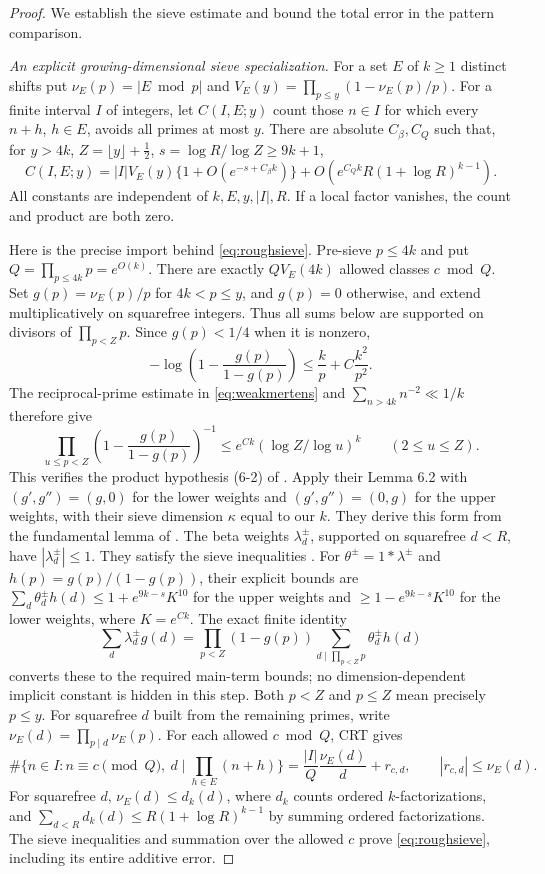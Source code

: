 \documentclass[11pt,a4paper]{article}
\begin{document}
\begin{proof}
We establish the sieve estimate and bound the total error in the pattern comparison.

\smallskip\noindent\emph{An explicit growing-dimensional sieve specialization.}
For a set $E$ of $k\ge1$ distinct shifts put
$\nu_E(p)=|E\bmod p|$ and
$V_E(y)=\prod_{p\le y}(1-\nu_E(p)/p)$.
For a finite interval $I$ of integers, let $C(I,E;y)$
count those $n\in I$ for which every $n+h$, $h\in E$, avoids all
primes at most $y$. There are absolute $C_\beta,C_Q$ such that,
for $y>4k$, $Z=\lfloor y\rfloor+\tfrac12$, $s=\log R/\log Z\ge9k+1$,
\begin{equation}\label{eq:roughsieve}
 C(I,E;y)=|I|V_E(y)\{1+O(e^{-s+C_\beta k})\}
       +O\!\left(e^{C_Qk}R(1+\log R)^{k-1}\right).
\end{equation}
All constants are independent of $k,E,y,|I|,R$.
If a local factor vanishes, the count and product are both zero.

Here is the precise import behind \eqref{eq:roughsieve}.
Pre-sieve $p\le4k$ and put $Q=\prod_{p\le4k}p=e^{O(k)}$.
There are exactly $QV_E(4k)$ allowed classes $c\bmod Q$.
Set $g(p)=\nu_E(p)/p$ for $4k<p\le y$, and $g(p)=0$ otherwise,
and extend multiplicatively on squarefree integers. Thus all sums below
are supported on divisors of $\prod_{p<Z}p$.
Since $g(p)<1/4$ when it is nonzero,
\[
 -\log\left(1-\frac{g(p)}{1-g(p)}\right)
       \le \frac{k}{p}+C\frac{k^2}{p^2}.
\]
The reciprocal-prime estimate in \eqref{eq:weakmertens}
and $\sum_{n>4k}n^{-2}\ll1/k$ therefore give
\[
 \prod_{u\le p<Z}\left(1-\frac{g(p)}{1-g(p)}\right)^{-1}
       \le e^{Ck}(\log Z/\log u)^k\qquad(2\le u\le Z).
\]
This verifies the product hypothesis (6-2) of
\cite[Section 6]{thornerzaman2019}. Apply their Lemma 6.2 with
$(g',g'')=(g,0)$ for the lower weights and $(g',g'')=(0,g)$ for the
upper weights, with their sieve dimension $\kappa$ equal to our $k$.
They derive this form from the fundamental lemma of
\cite[Lemma 6.8]{friedlanderiwaniec}. The beta weights $\lambda_d^\pm$,
supported on squarefree $d<R$, have $|\lambda_d^\pm|\le1$.
They satisfy the sieve inequalities \cite[equation (6-4)]{thornerzaman2019}.
For $\theta^\pm=1*\lambda^\pm$ and $h(p)=g(p)/(1-g(p))$, their
explicit bounds are $\sum_d\theta_d^\pm h(d)\le1+e^{9k-s}K^{10}$
for the upper weights and $\ge1-e^{9k-s}K^{10}$ for the lower weights,
where $K=e^{Ck}$. The exact finite identity
\[
 \sum_d\lambda_d^\pm g(d)
       =\prod_{p<Z}(1-g(p))\sum_{d\mid\prod_{p<Z}p}\theta_d^\pm h(d)
\]
converts these to the required main-term bounds; no dimension-dependent
implicit constant is hidden in this step. Both $p<Z$ and $p\le Z$
mean precisely $p\le y$.
For squarefree $d$ built from the remaining primes, write
$\nu_E(d)=\prod_{p\mid d}\nu_E(p)$. For each allowed $c\bmod Q$, CRT gives
\[
 \#\{n\in I:n\equiv c\pmod Q,\ d\mid\prod_{h\in E}(n+h)\}
       =\frac{|I|}Q\frac{\nu_E(d)}d+r_{c,d},\qquad
 |r_{c,d}|\le\nu_E(d).
\]
For squarefree $d$, $\nu_E(d)\le d_k(d)$, where $d_k$ counts ordered
$k$-factorizations, and
$\sum_{d<R}d_k(d)\le R(1+\log R)^{k-1}$ by summing ordered
factorizations. The sieve inequalities and summation over the allowed
$c$ prove \eqref{eq:roughsieve}, including its entire additive error.


\end{proof}
\end{document}
